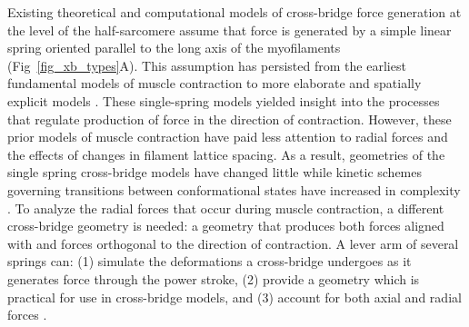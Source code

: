 \documentclass[10pt]{article}
\newcommand{\citep}[1]{\cite{#1}} %
\begin{document}
Existing theoretical and computational models of cross-bridge force generation at the level of the half-sarcomere assume that force is generated by a simple linear spring oriented parallel to the long axis of the myofilaments (Fig~\ref{fig_xb_types}A). 
This assumption has persisted from the earliest fundamental models of muscle contraction to more elaborate and spatially explicit models \citep{Huxley1957, Daniel1998, Chase2004, Tanner2007, Campbell2009}.  
These single-spring models yielded insight into the processes that regulate production of force in the direction of contraction.
However, these prior models of muscle contraction have paid less attention to radial forces and the effects of changes in filament lattice spacing. 
As a result, geometries of the single spring cross-bridge models have changed little while kinetic schemes governing transitions between conformational states have increased in complexity \citep{Huxley1957, Pate1989, Daniel1998, Smith2008a}. 
To analyze the radial forces that occur during muscle contraction, a different cross-bridge geometry is needed: a geometry that produces both forces aligned with and forces orthogonal to the direction of contraction. 
A lever arm of several springs can: (1) simulate the deformations a cross-bridge undergoes as it generates force through the power stroke, (2) provide a geometry which is practical for use in cross-bridge models, and (3) account for both axial and radial forces \citep{Houdusse2001}.  
\end{document}

